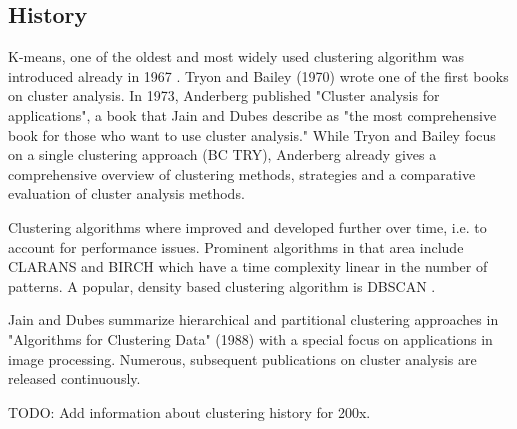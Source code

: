 \subsection{History}

K-means, one of the oldest and most widely used clustering algorithm was introduced already in 1967 \cite{MacQueen67kmeans, Meert06clustermaps}. Tryon and Bailey (1970) wrote one of the first books on cluster analysis. In 1973, Anderberg published "Cluster analysis for applications", a book that Jain and Dubes describe as "the most comprehensive book for those who want to use cluster analysis." \cite{Jain88clustering} While Tryon and Bailey focus on a single clustering approach (BC TRY), Anderberg already gives a comprehensive overview of clustering methods, strategies and a comparative evaluation of cluster analysis methods.

Clustering algorithms where improved and developed further over time, i.e. to account for performance issues. Prominent algorithms in that area include CLARANS \cite{Ng94CLARANS} and BIRCH \cite{Zhang96BIRCH} which have a time complexity linear in the number of patterns. A popular, density based clustering algorithm is DBSCAN \cite{Ester96DBSCAN}.

Jain and Dubes summarize hierarchical and partitional clustering approaches in "Algorithms for Clustering Data" (1988) with a special focus on applications in image processing. Numerous, subsequent publications on cluster analysis are released continuously. \cite{Jain99clusterreview}

TODO: Add information about clustering history for 200x.  

